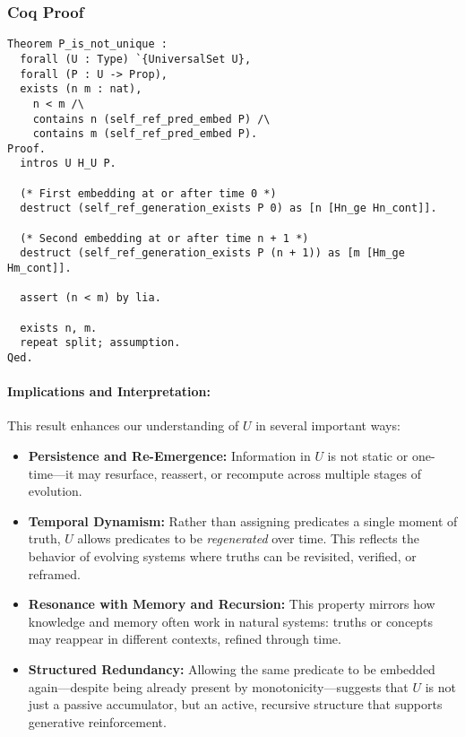 \documentclass[12pt]{article}
\begin{document}
\subsubsection{Coq Proof}
\begin{lstlisting}[language=Coq]
Theorem P_is_not_unique :
  forall (U : Type) `{UniversalSet U},
  forall (P : U -> Prop), 
  exists (n m : nat),
    n < m /\
    contains n (self_ref_pred_embed P) /\
    contains m (self_ref_pred_embed P).
Proof.
  intros U H_U P.

  (* First embedding at or after time 0 *)
  destruct (self_ref_generation_exists P 0) as [n [Hn_ge Hn_cont]].

  (* Second embedding at or after time n + 1 *)
  destruct (self_ref_generation_exists P (n + 1)) as [m [Hm_ge Hm_cont]].

  assert (n < m) by lia.

  exists n, m.
  repeat split; assumption.
Qed.
\end{lstlisting}

\paragraph{Implications and Interpretation:}
This result enhances our understanding of \( U \) in several important ways:

\begin{itemize}
    \item \textbf{Persistence and Re-Emergence:} Information in \( U \) is not static or one-time—it may resurface, reassert, or recompute across multiple stages of evolution.
    
    \item \textbf{Temporal Dynamism:} Rather than assigning predicates a single moment of truth, \( U \) allows predicates to be \textit{regenerated} over time. This reflects the behavior of evolving systems where truths can be revisited, verified, or reframed.

    \item \textbf{Resonance with Memory and Recursion:} This property mirrors how knowledge and memory often work in natural systems: truths or concepts may reappear in different contexts, refined through time.

    \item \textbf{Structured Redundancy:} Allowing the same predicate to be embedded again—despite being already present by monotonicity—suggests that \( U \) is not just a passive accumulator, but an active, recursive structure that supports generative reinforcement.
\end{itemize}
\end{document}
